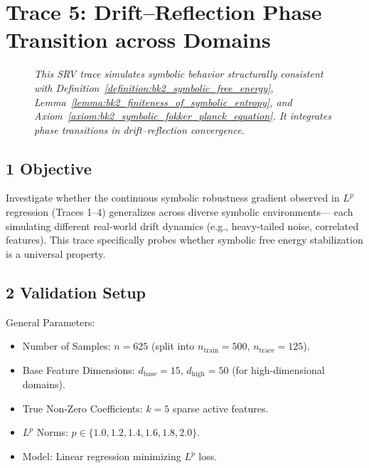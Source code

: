 \section*{Trace 5: Drift–Reflection Phase Transition across Domains}
\label{section:trace5_drift_reflection_transition}

\begin{figure}[htbp]
\centering
\caption[\textit{SRV trace (summary)}]{\textit{This SRV trace simulates symbolic behavior structurally consistent with Definition~\ref{definition:bk2_symbolic_free_energy}, Lemma~\ref{lemma:bk2_finiteness_of_symbolic_entropy}, and Axiom~\ref{axiom:bk2_symbolic_fokker_planck_equation}. It integrates phase transitions in drift–reflection convergence.}}
\label{figure:trace5_phase_transition_summary}
\end{figure}

\subsection*{1 Objective}
\label{subsection:trace5_objective}

Investigate whether the continuous symbolic robustness gradient  
observed in \( L^p \) regression (Traces 1–4)  
generalizes across diverse symbolic environments—  
each simulating different real-world drift dynamics  
(e.g., heavy-tailed noise, correlated features).  
This trace specifically probes whether symbolic free energy stabilization  
is a universal property.

\subsection*{2 Validation Setup}
\label{subsection:trace5_validation_setup}

General Parameters:
\begin{itemize}
    \item Number of Samples: $n = 625$ (split into $n_{\text{train}} = 500$, $n_{\text{trace}} = 125$).
    \item Base Feature Dimensions: $d_{\text{base}} = 15$, $d_{\text{high}} = 50$ (for high-dimensional domains).
    \item True Non-Zero Coefficients: $k = 5$ sparse active features.
    \item $L^p$ Norms: $p \in \{1.0, 1.2, 1.4, 1.6, 1.8, 2.0\}$.
    \item Model: Linear regression minimizing $L^p$ loss.
\end{itemize}

